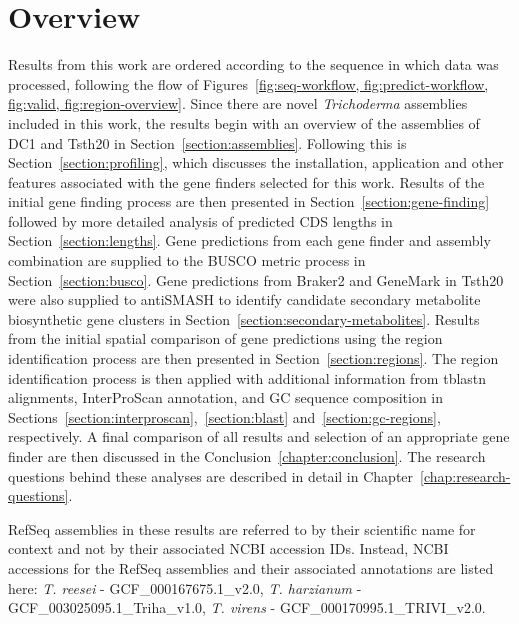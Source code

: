 \section{Overview}

Results from this work are ordered according to the sequence in which
data was processed, following the flow of
Figures~\ref{fig:seq-workflow, fig:predict-workflow, fig:valid,
  fig:region-overview}. Since there are novel \textit{Trichoderma}
assemblies included in this work, the results begin with an overview
of the assemblies of DC1 and Tsth20 in Section~\ref{section:assemblies}. Following this is Section~\ref{section:profiling}, which discusses the installation, application
and other features associated with the gene finders selected for this
work. Results of the initial gene finding process are then presented
in Section~\ref{section:gene-finding} followed by more detailed
analysis of predicted CDS lengths in Section~\ref{section:lengths}. Gene predictions from each gene finder and
assembly combination are supplied to the BUSCO metric process in
Section~\ref{section:busco}. Gene predictions from Braker2 and GeneMark in Tsth20 were also supplied to antiSMASH to identify candidate secondary metabolite biosynthetic gene clusters in Section~\ref{section:secondary-metabolites}. Results from the initial spatial
comparison of gene predictions using the region identification process
are then presented in Section~\ref{section:regions}. The region
identification process is then applied with additional information
from tblastn alignments, InterProScan annotation, and GC sequence
composition in Sections~\ref{section:interproscan},~\ref{section:blast} and~\ref{section:gc-regions}, respectively. A
final comparison of all results and selection of an appropriate gene
finder are then discussed in the Conclusion~\ref{chapter:conclusion}. The research questions behind these analyses
are described in detail in Chapter~\ref{chap:research-questions}.

RefSeq assemblies in these results are referred to by their scientific
name for context and not by their associated NCBI accession
IDs. Instead, NCBI accessions for the RefSeq assemblies and their
associated annotations are listed here: \textit{T. reesei} -
GCF\_000167675.1\_v2.0, \textit{T. harzianum} -
GCF\_003025095.1\_Triha\_v1.0, \textit{T. virens} - GCF\_000170995.1\_TRIVI\_v2.0.
